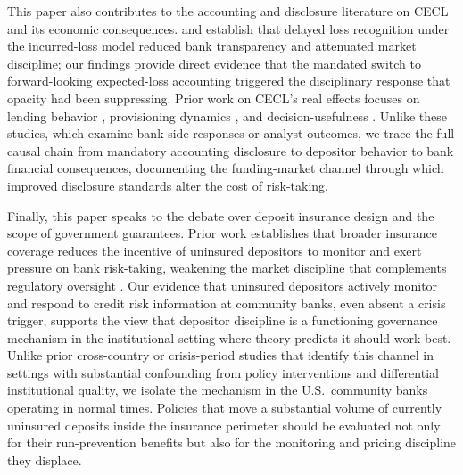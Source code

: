 This paper also contributes to the accounting and disclosure literature on CECL
and its economic consequences.  \citet{bushman2012accounting} and
\citet{bushman2015delayed} establish that delayed loss recognition under the
incurred-loss model reduced bank transparency and attenuated market discipline;
our findings provide direct evidence that the mandated switch to
forward-looking expected-loss accounting triggered the disciplinary response that
opacity had been suppressing.  Prior work on CECL's real effects focuses on
lending behavior \citep{granja2025current}, provisioning dynamics
\citep{kim2026current}, and decision-usefulness \citep{gee2022decision}.  Unlike
these studies, which examine bank-side responses or analyst outcomes, we trace the
full causal chain from mandatory accounting disclosure to depositor behavior to
bank financial consequences, documenting the funding-market channel through which
improved disclosure standards alter the cost of risk-taking.

Finally, this paper speaks to the debate over deposit insurance design and the
scope of government guarantees.  Prior work establishes that broader insurance
coverage reduces the incentive of uninsured depositors to monitor and exert
pressure on bank risk-taking, weakening the market discipline that complements
regulatory oversight \citep{demirgucc2004market, flannery2019market}.  Our
evidence that uninsured depositors actively monitor and respond to credit risk
information at community banks, even absent a crisis trigger, supports the view
that depositor discipline is a functioning governance mechanism in the
institutional setting where theory predicts it should work best.  Unlike prior
cross-country or crisis-period studies that identify this channel in settings
with substantial confounding from policy interventions and differential
institutional quality, we isolate the mechanism in the U.S.\ community banks operating in normal
times.  Policies that move a substantial volume of currently uninsured deposits
inside the insurance perimeter should be evaluated not only for their
run-prevention benefits but also for the monitoring and pricing discipline they
displace.
